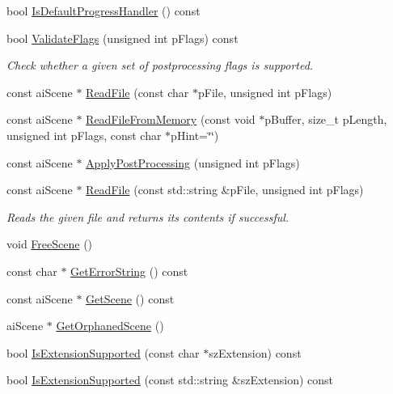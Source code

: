 \begin{DoxyCompactItemize}
\item 
bool \hyperlink{class_assimp_1_1_importer_a2d60d970eddf8f9d35b6e9b54214cedd}{Is\+Default\+Progress\+Handler} () const 
\item 
bool \hyperlink{class_assimp_1_1_importer_a780329e2dd0406e930291cf8ab9deb99}{Validate\+Flags} (unsigned int p\+Flags) const 
\begin{DoxyCompactList}\small\item\em Check whether a given set of postprocessing flags is supported. \end{DoxyCompactList}\item 
const ai\+Scene $\ast$ \hyperlink{class_assimp_1_1_importer_a174418ab41d5b8bc51a044895cb991e5}{Read\+File} (const char $\ast$p\+File, unsigned int p\+Flags)
\item 
const ai\+Scene $\ast$ \hyperlink{class_assimp_1_1_importer_a9b3c5e8b1042702f449e84a95b3324f6}{Read\+File\+From\+Memory} (const void $\ast$p\+Buffer, size\+\_\+t p\+Length, unsigned int p\+Flags, const char $\ast$p\+Hint=\char`\"{}\char`\"{})
\item 
const ai\+Scene $\ast$ \hyperlink{class_assimp_1_1_importer_a5872e749c1451fee64183fc14f1fc81d}{Apply\+Post\+Processing} (unsigned int p\+Flags)
\item 
const ai\+Scene $\ast$ \hyperlink{class_assimp_1_1_importer_a339882c7acb47d5b5110bbd078d870a9}{Read\+File} (const std\+::string \&p\+File, unsigned int p\+Flags)
\begin{DoxyCompactList}\small\item\em Reads the given file and returns its contents if successful. \end{DoxyCompactList}\item 
void \hyperlink{class_assimp_1_1_importer_a53dafc3046abc33365a07c605716c5d4}{Free\+Scene} ()
\item 
const char $\ast$ \hyperlink{class_assimp_1_1_importer_a23bab5ba8cb9b6886c690a610766668b}{Get\+Error\+String} () const 
\item 
const ai\+Scene $\ast$ \hyperlink{class_assimp_1_1_importer_a26fd479a6a955969c1377fa59f92db66}{Get\+Scene} () const 
\item 
ai\+Scene $\ast$ \hyperlink{class_assimp_1_1_importer_a60eb9042fb85bfbd61a863e131a56ecd}{Get\+Orphaned\+Scene} ()
\item 
bool \hyperlink{class_assimp_1_1_importer_a9146ea75c33c0aac0310195346877388}{Is\+Extension\+Supported} (const char $\ast$sz\+Extension) const 
\item 
bool \hyperlink{class_assimp_1_1_importer_a5b01905366f5bf8d1f89d51f755bf7d2}{Is\+Extension\+Supported} (const std\+::string \&sz\+Extension) const 

\end{DoxyCompactItemize}
